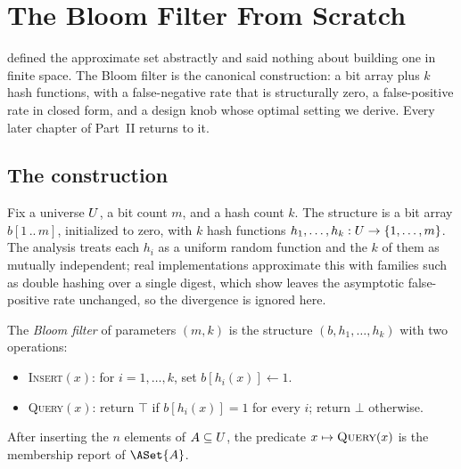 %

\section{The Bloom Filter From Scratch}
\label{sec:bloom-from-scratch}

 defined the approximate set abstractly and
said nothing about building one in finite space. The Bloom filter is the
canonical construction: a bit array plus $k$ hash functions, with a
false-negative rate that is structurally zero, a false-positive rate in
closed form, and a design knob whose optimal setting we derive. Every
later chapter of Part~II returns to it.

\subsection*{The construction}

Fix a universe $U$, a bit count $m$, and a hash count $k$. The
structure is a bit array $b[1\,..\,m]$, initialized to zero, with $k$ hash
functions $h_1, \ldots, h_k : U \to \{1, \ldots, m\}$. The
analysis treats each $h_i$ as a uniform random function and the $k$ of
them as mutually independent; real implementations approximate this with
families such as double hashing over a single digest, which
\textcite{kirsch-mitzenmacher-2008} show leaves the asymptotic
false-positive rate unchanged, so the divergence is ignored here.

\begin{definition}
\label{def:bloom-filter}
The \emph{Bloom filter} of parameters $(m, k)$ is the structure
$(b, h_1, \ldots, h_k)$ with two operations:
\begin{itemize}
  \item \textsc{Insert}$(x)$: for $i = 1, \ldots, k$, set $b[h_i(x)] \gets 1$.
  \item \textsc{Query}$(x)$: return $\top$ if $b[h_i(x)] = 1$ for every
    $i$; return $\bot$ otherwise.
\end{itemize}
After inserting the $n$ elements of $A \subseteq U$, the predicate
$x \mapsto \textsc{Query}(x)$ is the membership report of $\ASet{A}$.
\end{definition}

